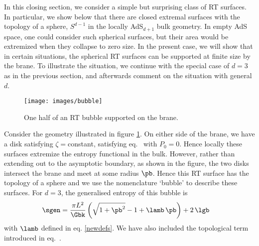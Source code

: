 %







In this closing section, we consider a simple but surprising class of RT surfaces. In particular, we show below that there are closed extremal surfaces with the topology of a sphere, \ie $S^{d-1}$ in the locally AdS$_{d+1}$ bulk geometry. In empty AdS space, one could consider such spherical surfaces, but their area would be extremized when they collapse to zero size. In the present case, we will show that in certain situations, the spherical RT surfaces can be supported at finite size by the brane.  To illustrate the situation, we continue with the special case of $d=3$ as in the previous section, and afterwards comment on the situation with general $d$. 
%
\begin{figure}[h]
\begin{center}
\texttt{[image: images/bubble]}
\caption{One half of an RT bubble supported on the brane. }
\label{figbubble}
\end{center}
\end{figure}

Consider the geometry illustrated in figure \ref{figbubble}. On either side of the brane, we have a disk satisfying $\zeta=$constant, \ie satisfying eq.~ with $P_0=0$. Hence locally these surfaces extremize the entropy functional  in the bulk. However, rather than extending out to the asymptotic boundary, as shown in the figure, the two disks intersect the brane and meet at some radius $\pb$.  Hence this RT surface has the topology of a sphere and we use the nomenclature `bubble' to describe these surfaces. For $d=3$, the generalised entropy  of this bubble is
\begin{align}\label{Agenbubble}
\sgen&=\frac{\pi L^2}{\Gbk} \left(  \sqrt{1+\pb^2}-1  + \lamb\, \pb \right) +2\,\lgb 
\end{align}
with $\lamb$ defined in eq. \eqref{newdefs}. We have also included the topological term introduced in eq.~.

